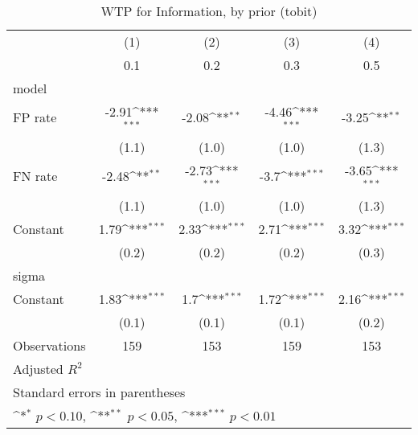 \begin{table}[htbp]\centering
\def\sym#1{\ifmmode^{#1}\else\(^{#1}\)\fi}
\caption{WTP for Information, by prior (tobit)}
\begin{tabular}{l*{4}{c}}
\hline\hline
                &\multicolumn{1}{c}{(1)}&\multicolumn{1}{c}{(2)}&\multicolumn{1}{c}{(3)}&\multicolumn{1}{c}{(4)}\\
                &\multicolumn{1}{c}{0.1}&\multicolumn{1}{c}{0.2}&\multicolumn{1}{c}{0.3}&\multicolumn{1}{c}{0.5}\\
\hline
model           &                  &                  &                  &                  \\
FP rate         &    -2.91\sym{***}&    -2.08\sym{**} &    -4.46\sym{***}&    -3.25\sym{**} \\
                &    (1.1)         &    (1.0)         &    (1.0)         &    (1.3)         \\
FN rate         &    -2.48\sym{**} &    -2.73\sym{***}&     -3.7\sym{***}&    -3.65\sym{***}\\
                &    (1.1)         &    (1.0)         &    (1.0)         &    (1.3)         \\
Constant        &     1.79\sym{***}&     2.33\sym{***}&     2.71\sym{***}&     3.32\sym{***}\\
                &    (0.2)         &    (0.2)         &    (0.2)         &    (0.3)         \\
\hline
sigma           &                  &                  &                  &                  \\
Constant        &     1.83\sym{***}&      1.7\sym{***}&     1.72\sym{***}&     2.16\sym{***}\\
                &    (0.1)         &    (0.1)         &    (0.1)         &    (0.2)         \\
\hline
Observations    &      159         &      153         &      159         &      153         \\
Adjusted \(R^{2}\)&                  &                  &                  &                  \\
\hline\hline
\multicolumn{5}{l}{\footnotesize Standard errors in parentheses}\\
\multicolumn{5}{l}{\footnotesize \sym{*} \(p<0.10\), \sym{**} \(p<0.05\), \sym{***} \(p<0.01\)}\\
\end{tabular}
\end{table}
